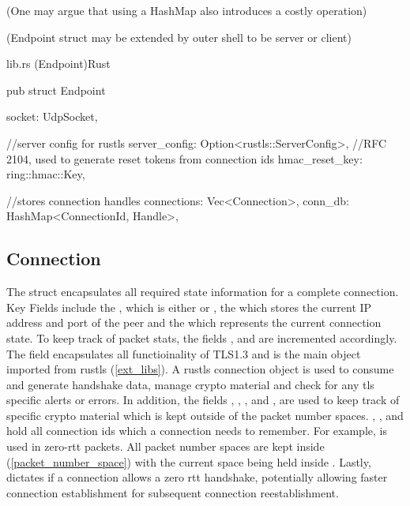 (One may argue that using a HashMap also introduces a costly operation)

(Endpoint struct may be extended by outer shell to be server or client)

\begin{codeblock}{lib.rs (Endpoint)}{Rust}
  \begin{rustcode}
    pub struct Endpoint {
        socket: UdpSocket,

        //server config for rustls
        server_config: Option<rustls::ServerConfig>,
        //RFC 2104, used to generate reset tokens from connection ids
        hmac_reset_key: ring::hmac::Key,

        //stores connection handles
        connections: Vec<Connection>,
        conn_db: HashMap<ConnectionId, Handle>,
    }
  \end{rustcode}
\end{codeblock}

\subsection{Connection}

The  struct encapsulates all required state information for a complete connection. Key Fields include the ,
which is either  or , the  which stores the current IP address and port of the peer and the 
 which represents the current connection state. To keep track of packet stats, the fields ,  and 
 are incremented accordingly. The  field encapsulates all functioinality of TLS1.3 and is the main object
imported from rustls (\ref{ext_libs}). A rustls connection object is used to consume and generate handshake data, manage crypto material and check for
any tls specific alerts or errors. In addition, the fields , , ,
 and , are used to keep track of specific crypto material which is kept outside of the packet
number spaces. , ,  and  hold all connection
ids which a connection needs to remember. For example,  is used in zero-rtt packets. All packet number spaces are kept inside
(\ref{packet_number_space}) with the current space being held inside . Lastly, 
dictates if a connection allows a zero rtt handshake, potentially allowing faster connection establishment for subsequent connection reestablishment.


